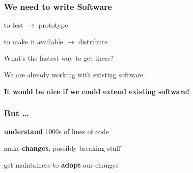 \documentclass{beamer}
\newenvironment{wideitemize}{
    \itemize\addtolength{\itemsep}{15pt}\addtolength{\topsep}{10pt}}{\enditemize}
\begin{document}
    \begin{frame}
        \frametitle{We need to write Software}
        \begin{wideitemize}
            \item to test $\to$ prototype
            \item to make it available $\to$ distribute
        \end{wideitemize}

    \vspace{0.5cm}

    \pause

    What's the fastest way to get there?

    \vspace{0.5cm}

    \pause

    We are already working with existing software.

    \vspace{0.5cm}

    \pause

    \textbf{It would be nice if we could extend existing software!}
    \end{frame}

    \begin{frame}
        \frametitle{But \ldots}
        \begin{wideitemize}
            \item<2-> \textbf{understand} 1000s of lines of code
            \item<3-> make \textbf{changes}, possibly breaking stuff
            \item<4-> get maintainers to \textbf{adopt} our changes
        \end{wideitemize}

        \vspace{1cm}

    \end{frame}
\end{document}
